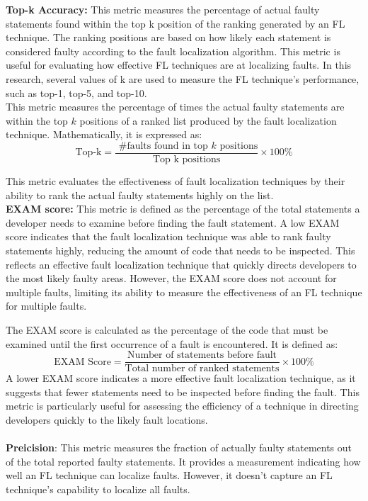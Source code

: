 \documentclass[conference]{IEEEtran}
\begin{document}
\textbf{Top-k Accuracy:} This metric measures the percentage of actual faulty statements found within the top k position of the ranking generated by an FL technique. The ranking positions are based on how likely each statement is considered faulty according to the fault localization algorithm. This metric is useful for evaluating how effective FL techniques are at localizing faults. In this research, several values of k are used to measure the FL technique's performance, such as top-1, top-5, and top-10.
\\
This metric measures the percentage of times the actual faulty statements are within the top $k$ positions of a ranked list produced by the fault localization technique. Mathematically, it is expressed as:
    \[
        \text{Top-k} = \frac{\text{ \#faults found in top } k \text{ positions}}{\text{Top k positions}} \times 100\%
    \]

    This metric evaluates the effectiveness of fault localization techniques by their ability to rank the actual faulty statements highly on the list.
    \\

    \textbf{EXAM score:}  This metric is defined as the percentage of the total statements a developer needs to examine before finding the fault statement. A low EXAM score indicates that the fault localization technique was able to rank faulty statements highly, reducing the amount of code that needs to be inspected. This reflects an effective fault localization technique that quickly directs developers to the most likely faulty areas. However, the EXAM score does not account for multiple faults, limiting its ability to measure the effectiveness of an FL technique for multiple faults.

    The EXAM score is calculated as the percentage of the code that must be examined until the first occurrence of a fault is encountered. It is defined as:
    \\
    \[
        \text{EXAM Score} = \frac{\text{Number of statements before fault}}{\text{Total number of ranked statements}} \times 100\%
    \]
    A lower EXAM score indicates a more effective fault localization technique, as it suggests that fewer statements need to be inspected before finding the fault. This metric is particularly useful for assessing the efficiency of a technique in directing developers quickly to the likely fault locations.
    \\ \\
    \textbf{Preicision}: This metric measures the fraction of actually faulty statements out of the total reported faulty statements. It provides a measurement indicating how well an FL technique can localize faults. However, it doesn't capture an FL technique's capability to localize all faults.
    \\
\end{document}
